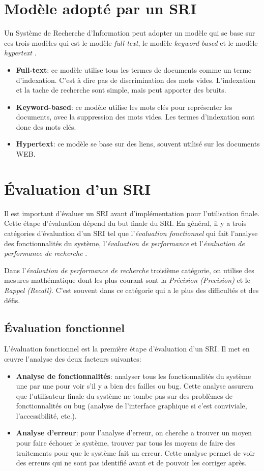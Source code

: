 \section{Modèle adopté par un SRI}
Un Système de Recherche d'Information peut adopter un modèle qui se base sur ces trois modèles qui est le modèle \textit{full-text}, le modèle \textit{keyword-based} et le modèle \textit{hypertext} \citep{modern-ir}.
\begin{itemize}
	\item \textbf{Full-text}: ce modèle utilise tous les termes de documents comme un terme d'indexation. C'est à dire pas de discrimination des mots vides. L'indexation et la tache de recherche sont simple, mais peut apporter des bruits.
	\item \textbf{Keyword-based}: ce modèle utilise les mots clés pour représenter les documents, avec la suppression des mots vides. Les termes d'indexation sont donc des mots clés.
	\item \textbf{Hypertext}: ce modèle se base sur des liens, souvent utilisé sur les documents WEB\@.
\end{itemize}

\section{Évaluation d'un SRI}
Il est important d’évaluer un SRI avant d’implémentation pour l'utilisation finale. Cette étape d'évaluation dépend du but finale du SRI\@. En général, il y a trois catégories d'évaluation d'un SRI tel que l'\textit{évaluation fonctionnel} qui fait l'analyse des fonctionnalités du système, l'\textit{évaluation de performance} et l'\textit{évaluation de performance de recherche} \citep{modern-ir}.

Dans l'\emph{évaluation de performance de recherche} troisième catégorie, on utilise des mesures mathématique dont les plus courant sont la \textit{Précision (Precision)} et le \textit{Rappel (Recall)}. C'est souvent dans ce catégorie qui a le plus des difficultés et des défis.

\subsection{Évaluation fonctionnel}
L'évaluation fonctionnel est la première étape d'évaluation d'un SRI\@. Il met en œuvre l'analyse des deux facteurs suivantes:
\begin{itemize}
	\item \textbf{Analyse de fonctionnalités}: analyser tous les fonctionnalités du système une par une pour voir s'il y a bien des failles ou bug. Cette analyse assurera que l'utilisateur finale du système ne tombe pas sur des problèmes de fonctionnalités ou bug (analyse de l'interface graphique si c'est conviviale, l'accessibilité, etc.).
	\item \textbf{Analyse d’erreur}: pour l'analyse d'erreur, on cherche a trouver un moyen pour faire échouer le système, trouver par tous les moyens de faire des traitements pour que le système fait un erreur. Cette analyse permet de voir des erreurs qui ne sont pas identifié avant et de pouvoir les corriger après.
\end{itemize}

